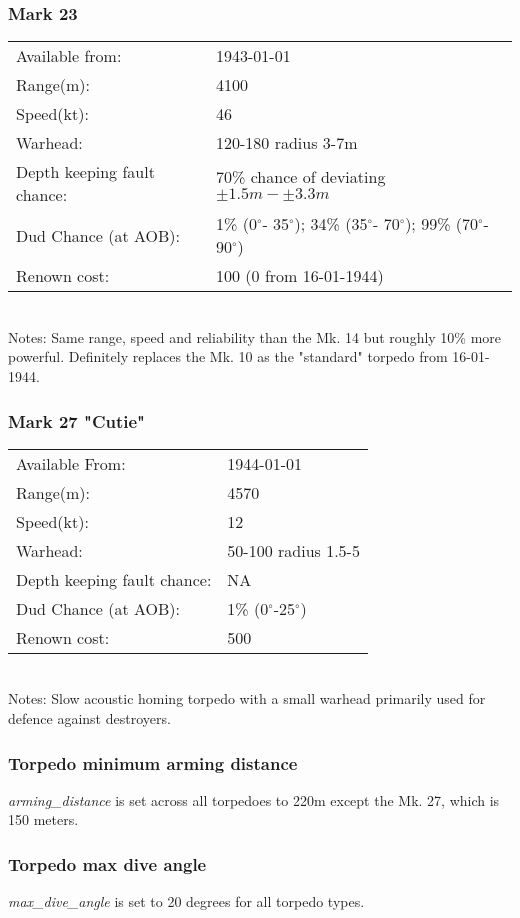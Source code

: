 \documentclass{article}
\newcommand{\degree}{$^{\circ}$}
\begin{document}
\subsubsection{Mark 23}
\begin{tabular}{l|l}
Available from:& 1943-01-01\\
Range(m):& 4100\\
Speed(kt):&46\\
Warhead:& 120-180 radius 3-7m\\
Depth keeping fault chance:& 70\% chance of deviating $\pm 1.5m - \pm 3.3m$\\
Dud Chance (at AOB):& 1\% (0\degree - 35\degree); 34\% (35\degree- 70\degree); 99\% (70\degree- 90\degree)\\
Renown cost:&  100 (0 from 16-01-1944)\\
\end{tabular} \\
Notes: Same range, speed and reliability than the Mk. 14 but roughly 10\% more powerful. Definitely replaces the Mk. 10 as the "standard" torpedo from 16-01-1944.

\subsubsection{Mark 27 "Cutie"}
\begin{tabular}{l|l}
Available From:& 1944-01-01\\
Range(m):& 4570\\
Speed(kt):&12\\
Warhead:& 50-100 radius 1.5-5\\
Depth keeping fault chance:& NA\\
Dud Chance (at AOB):& 1\% (0\degree-25\degree)\\
Renown cost:& 500\\
\end{tabular} \\
Notes: Slow acoustic homing torpedo with a small warhead primarily used for defence against destroyers.

\subsubsection{Torpedo minimum arming distance}
\emph{arming\_distance} is set across all torpedoes to 220m except the Mk. 27, which is 150 meters.

\subsubsection{Torpedo max dive angle}
\emph{max\_dive\_angle} is set to 20 degrees for all torpedo types.
\end{document}
